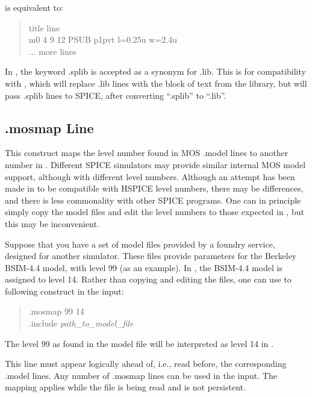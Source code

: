    is equivalent to:
\begin{quote}\vt
    title line\\
    m0 4 9 12 PSUB p1pvt l=0.25u w=2.4u\\
    {\rm ... more lines}
\end{quote}

In {\WRspice}, the keyword {\vt .splib} is accepted as a synonym for
{\vt .lib}.  This is for compatibility with {\Xic}, which will replace
{\vt .lib} lines with the block of text from the library, but will
pass {\vt .splib} lines to SPICE, after converting ``{\vt .splib}'' to
``{\vt .lib}''.

\subsection{{\vt .mosmap} Line}

This construct maps the level number found in MOS {\vt .model} lines
to another number in {\WRspice}.  Different SPICE simulators may
provide similar internal MOS model support, although with different
level numbers.  Although an attempt has been made in {\WRspice} to be
compatible with HSPICE level numbers, there may be differences, and
there is less commonality with other SPICE programs.  One can in
principle simply copy the model files and edit the level numbers to
those expected in {\WRspice}, but this may be inconvenient.

Suppose that you have a set of model files provided by a foundry
service, designed for another simulator.  These files provide
parameters for the Berkeley BSIM-4.4 model, with level 99 (as an
example).  In {\WRspice}, the BSIM-4.4 model is assigned to level 14. 
Rather than copying and editing the files, one can use to following
construct in the {\WRspice} input:

\begin{quote}
{\vt .mosmap 99 14}\\
{\vt .include} {\it path\_to\_model\_file}
\end{quote}

The level 99 as found in the model file will be interpreted as 
level 14 in {\WRspice}.

This line must appear logically ahead of, i.e., read before, the
corresponding {\vt .model} lines.  Any number of {\vt .mosmap} lines
can be used in the input.  The mapping applies while the file is being
read and is not persistent.

